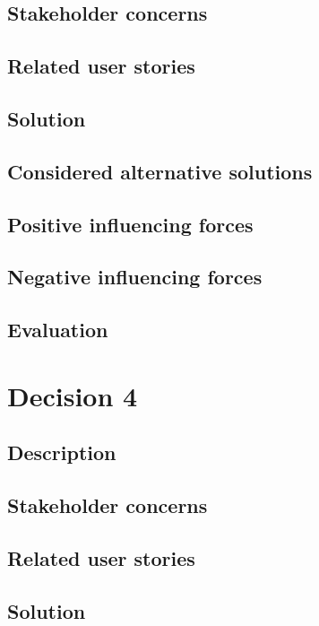 \documentclass[12pt, a4paper]{article}
\begin{document}
\subsection{Stakeholder concerns}

\subsection{Related user stories}

\subsection{Solution}

\subsection{Considered alternative solutions}


\subsection{Positive influencing forces}

\subsection{Negative influencing forces}

\subsection{Evaluation}

\newpage
\section{Decision 4}
\subsection{Description}

\subsection{Stakeholder concerns}

\subsection{Related user stories}

\subsection{Solution}
\end{document}
